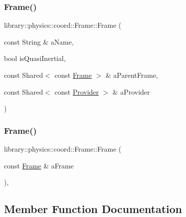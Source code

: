\subsubsection{\texorpdfstring{Frame()}{Frame()}\hspace{0.1cm}{\footnotesize\ttfamily [1/2]}}
{\footnotesize\ttfamily library\+::physics\+::coord\+::\+Frame\+::\+Frame (\begin{DoxyParamCaption}\item[{const String \&}]{a\+Name,  }\item[{bool}]{is\+Quasi\+Inertial,  }\item[{const Shared$<$ const \hyperlink{classlibrary_1_1physics_1_1coord_1_1_frame}{Frame} $>$ \&}]{a\+Parent\+Frame,  }\item[{const Shared$<$ const \hyperlink{classlibrary_1_1physics_1_1coord_1_1frame_1_1_provider}{Provider} $>$ \&}]{a\+Provider }\end{DoxyParamCaption})\hspace{0.3cm}{\ttfamily [protected]}}

\mbox{\label{classlibrary_1_1physics_1_1coord_1_1_frame_abacc320c21194a591bf76612d91bafb9}} 
\subsubsection{\texorpdfstring{Frame()}{Frame()}\hspace{0.1cm}{\footnotesize\ttfamily [2/2]}}
{\footnotesize\ttfamily library\+::physics\+::coord\+::\+Frame\+::\+Frame (\begin{DoxyParamCaption}\item[{const \hyperlink{classlibrary_1_1physics_1_1coord_1_1_frame}{Frame} \&}]{a\+Frame }\end{DoxyParamCaption})\hspace{0.3cm}{\ttfamily [protected]}, {\ttfamily [default]}}



\subsection{Member Function Documentation}
\mbox{\label{classlibrary_1_1physics_1_1coord_1_1_frame_abcadc7427a971aa37a66123cb9b8322b}} 

